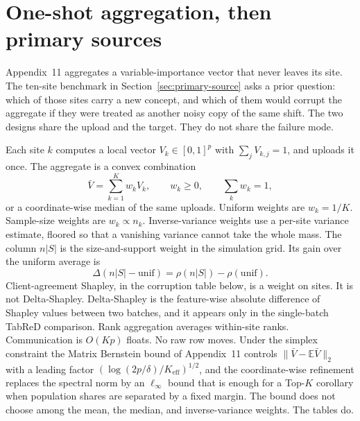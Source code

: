
\section{One-shot aggregation, then primary sources}
\label{sec:joint}

Appendix~11 aggregates a variable-importance vector that never leaves its
site.
The ten-site benchmark in Section~\ref{sec:primary-source} asks a prior
question: which of those sites carry a new concept, and which of them
would corrupt the aggregate if they were treated as another noisy copy of
the same shift.
The two designs share the upload and the target.
They do not share the failure mode.

Each site $k$ computes a local vector $V_k\in[0,1]^p$ with
$\sum_j V_{k,j}=1$, and uploads it once.
The aggregate is a convex combination
\begin{equation}
\label{eq:aggregate}
\bar V=\sum_{k=1}^{K} w_k V_k,
\qquad w_k\ge 0,
\qquad \sum_k w_k=1,
\end{equation}
or a coordinate-wise median of the same uploads.
Uniform weights are $w_k=1/K$.
Sample-size weights are $w_k\propto n_k$.
Inverse-variance weights use a per-site variance estimate, floored so that
a vanishing variance cannot take the whole mass.
The column $n|S|$ is the size-and-support weight in the simulation grid.
Its gain over the uniform average is
\begin{equation}
\label{eq:delta-ns}
\Delta(n|S|-\mathrm{unif})
=
\rho(n|S|)-\rho(\mathrm{unif}).
\end{equation}
Client-agreement Shapley, in the corruption table below, is a weight on
sites.
It is not Delta-Shapley.
Delta-Shapley is the feature-wise absolute difference of Shapley values
between two batches, and it appears only in the single-batch TabReD
comparison.
Rank aggregation averages within-site ranks.
Communication is $O(Kp)$ floats.
No raw row moves.
Under the simplex constraint the Matrix Bernstein bound of
Appendix~11 controls $\|\bar V-\mathbb{E}\bar V\|_2$ with a leading factor
$(\log(2p/\delta)/K_{\mathrm{eff}})^{1/2}$, and the coordinate-wise
refinement replaces the spectral norm by an $\ell_\infty$ bound that is
enough for a Top-$K$ corollary when population shares are separated by a
fixed margin.
The bound does not choose among the mean, the median, and inverse-variance
weights.
The tables do.

